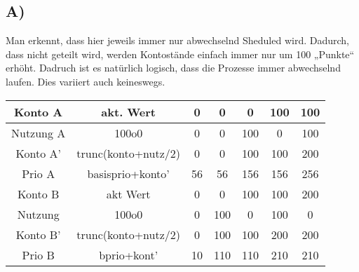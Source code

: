 
\subsection{A)}
    Man erkennt, dass hier jeweils immer nur abwechselnd Sheduled wird.
    Dadurch, dass nicht geteilt wird, werden Kontostände einfach immer nur um 100 „Punkte“ erhöht.
    Dadruch ist es natürlich logisch, dass die Prozesse immer abwechselnd laufen.
    Dies variiert auch keineswegs.

    \begin{center}
        \begin{tabular}{|c|c|c|c|c|c|c|} \hline
            Konto A     &   akt. Wert        &   0   &   0       &   0       &   100     &   100     \\  \hline
            Nutzung A   &   100o0           &   0   &   0       &   100     &   0       &   100     \\  \hline
            Konto A'    &   trunc(konto+nutz/2)     &   0   &   0       &   100     &   100     &   200     \\  \hline
            Prio A      &   basisprio+konto'     &   56  &   56      &   156     &   156     &   256     \\  \hline\hline
            Konto B     &   akt Wert        &   0   &   0       &   100     &   100     &   200     \\  \hline
            Nutzung     &   100o0          &   0   &   100     &   0       &   100     &   0       \\  \hline
            Konto B'    &   trunc(konto+nutz/2)      &   0   &   100     &   100     &   200     &   200     \\  \hline
            Prio B      &   bprio+kont'     &   10  &   110     &   110     &   210     &   210     \\  \hline
        \end{tabular}
    \end{center}

